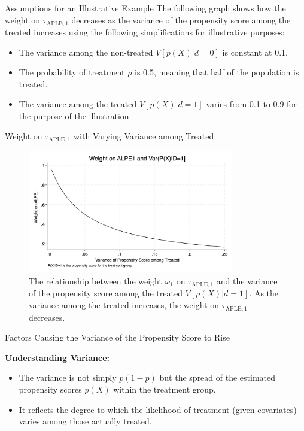 \documentclass{beamer}
\begin{document}
\begin{frame}{Assumptions for an Illustrative Example}
    The following graph shows how the weight on \( \tau_{\text{APLE},1} \) decreases as the variance of the propensity score among the treated increases using the following simplifications for illustrative purposes:
    \begin{itemize}
        \item The variance among the non-treated \( V[p(X) | d = 0] \) is constant at 0.1.
        \item The probability of treatment \( \rho \) is 0.5, meaning that half of the population is treated.
        \item The variance among the treated \( V[p(X) | d = 1] \) varies from 0.1 to 0.9 for the purpose of the illustration.
    \end{itemize}
\end{frame}


\begin{frame}{Weight on \( \tau_{\text{APLE},1} \) with Varying Variance among Treated}
    \begin{figure}
        \centering
        \includegraphics[width=0.8\textwidth]{./lecture_includes/tymon_variance_weight.png}
        \caption{The relationship between the weight \( \omega_1 \) on \( \tau_{\text{APLE},1} \) and the variance of the propensity score among the treated \( V[p(X) | d = 1] \). As the variance among the treated increases, the weight on \( \tau_{\text{APLE},1} \) decreases.}
    \end{figure}
\end{frame}

\begin{frame}{Factors Causing the Variance of the Propensity Score to Rise}


\textbf{Understanding Variance:}
\begin{itemize}
  \item The variance is not simply \( p(1-p) \) but the spread of the estimated propensity scores \( p(X) \) within the treatment group.
  \item It reflects the degree to which the likelihood of treatment (given covariates) varies among those actually treated.
\end{itemize}
\end{frame}
\end{document}
